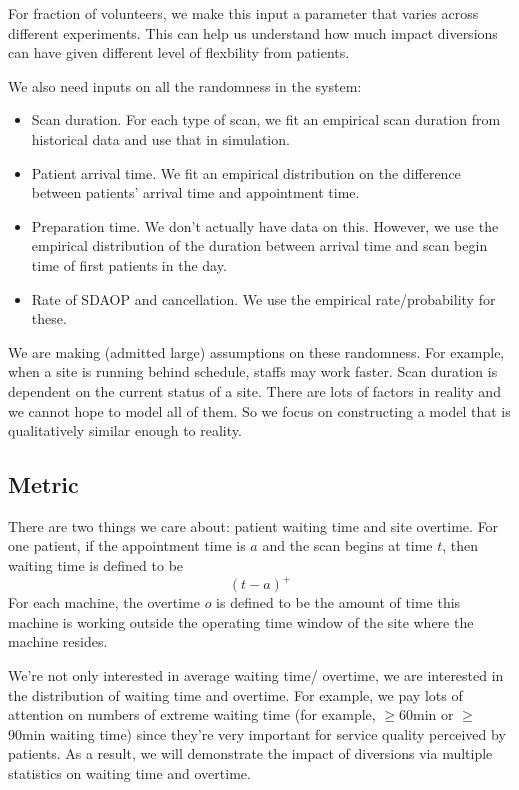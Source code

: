 For fraction of volunteers, we make this input a parameter that
varies across different experiments. This can help us understand
how much impact diversions can have given different level of
flexbility from patients.

We also need inputs on all the randomness in the system:
\begin{itemize}
\item Scan duration. For each type of scan, we fit an empirical
scan duration from historical data and use that in simulation.
\item Patient arrival time. We fit an empirical distribution on
the difference between patients' arrival time and appointment time.
\item Preparation time. We don't actually have data on this. However,
we use the empirical distribution of the duration between arrival time
and scan begin time of first patients in the day.
\item Rate of SDAOP and cancellation. We use the empirical rate/probability
for these.
\end{itemize}
We are making (admitted large) assumptions on these randomness.
For example, when a site is running behind schedule, staffs
may work faster. Scan duration is dependent on the current status
of a site. There are lots of factors in reality and we cannot
hope to model all of them. So we focus on constructing a model
that is qualitatively similar enough to reality.


\subsection{Metric}

There are two things we care about: patient waiting time and
site overtime. For one patient, if the appointment time is $a$
and the scan begins at time $t$, then waiting time is defined
to be
\[  (t - a)^+ \]
For each machine, the overtime $o$ is defined to be the amount of
time this machine is working outside the operating time window
of the site where the machine resides.

We're not only interested in average waiting time/
overtime, we are interested in the distribution of waiting time
and overtime. For example, we pay lots of attention on numbers of extreme
waiting time (for example, $\ge$60min or $\ge$90min waiting time)
since they're very important for service quality perceived by patients.
As a result, we will demonstrate the impact of diversions via
multiple statistics on waiting time and overtime.
